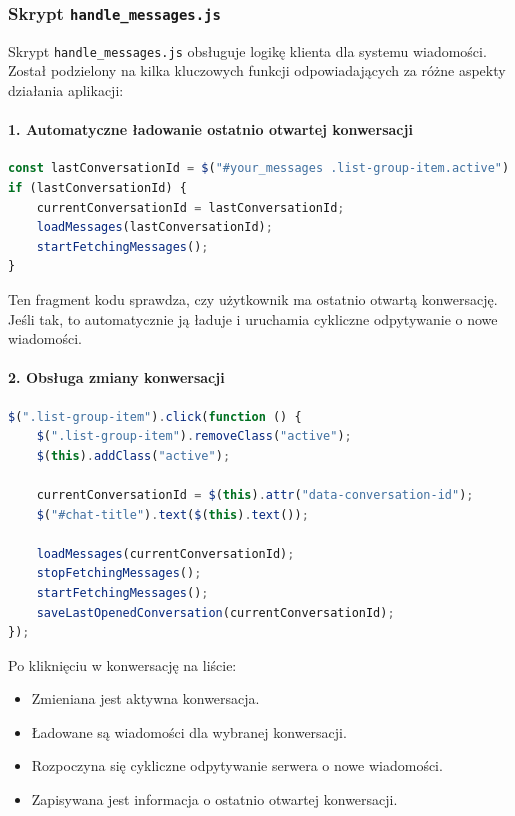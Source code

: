 \documentclass[12pt,a4paper,oneside]{article}
\theoremstyle{definition}
\numberwithin{equation}{section}
\begin{document}
\subsubsection{Skrypt \texttt{handle\_messages.js}}
Skrypt \texttt{handle\_messages.js} obsługuje logikę klienta dla systemu wiadomości. Został podzielony na kilka kluczowych funkcji odpowiadających za różne aspekty działania aplikacji:



\paragraph{1. Automatyczne ładowanie ostatnio otwartej konwersacji}
\begin{lstlisting}[language=JavaScript, caption=Automatyczne ładowanie ostatnio otwartej konwersacji]
const lastConversationId = $("#your_messages .list-group-item.active").data("conversation-id");
if (lastConversationId) {
    currentConversationId = lastConversationId;
    loadMessages(lastConversationId);
    startFetchingMessages();
}
\end{lstlisting}
Ten fragment kodu sprawdza, czy użytkownik ma ostatnio otwartą konwersację. Jeśli tak, to automatycznie ją ładuje i uruchamia cykliczne odpytywanie o nowe wiadomości.



\paragraph{2. Obsługa zmiany konwersacji}
\begin{lstlisting}[language=JavaScript, caption=Obsługa zmiany konwersacji]
$(".list-group-item").click(function () {
    $(".list-group-item").removeClass("active");
    $(this).addClass("active");

    currentConversationId = $(this).attr("data-conversation-id");
    $("#chat-title").text($(this).text());

    loadMessages(currentConversationId);
    stopFetchingMessages();
    startFetchingMessages();
    saveLastOpenedConversation(currentConversationId);
});
\end{lstlisting}
Po kliknięciu w konwersację na liście:
\begin{itemize}
    \item Zmieniana jest aktywna konwersacja.
    \item Ładowane są wiadomości dla wybranej konwersacji.
    \item Rozpoczyna się cykliczne odpytywanie serwera o nowe wiadomości.
    \item Zapisywana jest informacja o ostatnio otwartej konwersacji.
\end{itemize}
\end{document}
